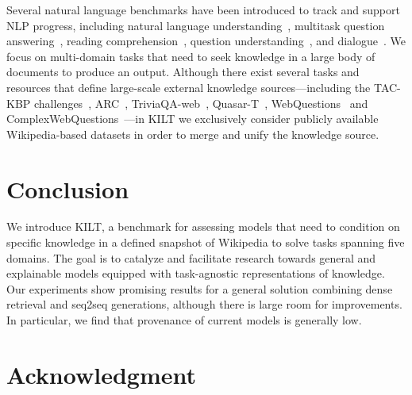 \documentclass[11pt]{article}
\begin{document}
Several natural language benchmarks have been introduced to track and support NLP progress, including natural language understanding~\cite{wang2018glue,wang2019superglue}, multitask question answering~\cite{mccann2018natural}, reading comprehension~\cite{dua2019orb}, question understanding~\cite{wolfson2020break}, and dialogue~\cite{shuster2019dialogue}. We focus on multi-domain tasks that need to seek knowledge in a large body of documents to produce an output.
Although there exist several tasks and resources that define large-scale external knowledge sources---including the TAC-KBP challenges~\cite{mcnamee2009overview, ji2010overview, surdeanu2013overview, surdeanu2014overview}, ARC~\cite{clark2018think}, TriviaQA-web~\cite{joshi2017triviaqa}, Quasar-T~\cite{dhingra2017quasar}, WebQuestions~\cite{berant2013semantic} and ComplexWebQuestions~\cite{talmor2018web}---in KILT we exclusively consider publicly available Wikipedia-based datasets in order to merge and unify the knowledge source.






\iffalse
DPR~\citep{karpukhin2020dense}
REALM~\cite{guu2020realm}
ORQA~\citep{lee2019latent}
RAG~\citep{lewis2020retrievalaugmented}

\citep{weissenborn2017dynamic}


\citep{DBLP:conf/emnlp/NogueiraC17}


\citep{DBLP:conf/acl/BranavanSB11}
\fi \section{Conclusion}

We introduce KILT, a benchmark for assessing models that need to condition on specific  knowledge in a defined snapshot of Wikipedia to solve tasks spanning five domains. The goal is to catalyze and facilitate research towards general and explainable models equipped with task-agnostic  representations of knowledge.
Our experiments show promising results for a general solution combining dense retrieval and seq2seq generations, although there is large room for improvements.
In particular, we find that provenance of current models is generally low.



%
 
\section{Acknowledgment}
\label{acknowledgment}
\end{document}
